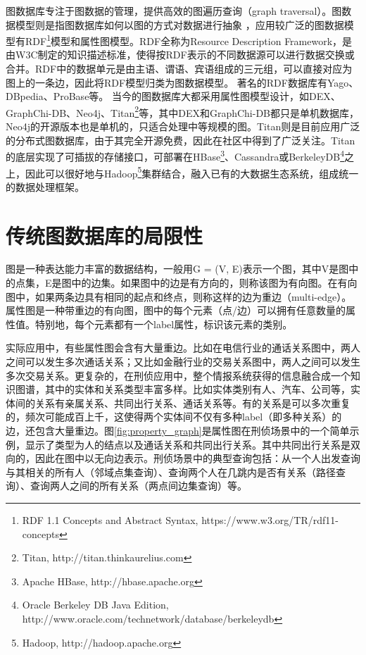 图数据库专注于图数据的管理，提供高效的图遍历查询（graph traversal）。图数据模型则是指图数据库如何以图的方式对数据进行抽象 \supercite{graph_models_survey}，应用较广泛的图数据模型有RDF\footnote{RDF 1.1 Concepts and Abstract Syntax, https://www.w3.org/TR/rdf11-concepts }模型和属性图模型。RDF全称为Resource Description Framework，是由W3C制定的知识描述标准，使得按RDF表示的不同数据源可以进行数据交换或合并。RDF中的数据单元是由主语、谓语、宾语组成的三元组，可以直接对应为图上的一条边，因此将RDF模型归类为图数据模型。
著名的RDF数据库有Yago\supercite{yago}、DBpedia\supercite{dbpedia}、ProBase\supercite{probase}等。
当今的图数据库大都采用属性图模型设计\supercite{graph_database_models}，如DEX\supercite{DEX}、GraphChi-DB\supercite{graphchi-db}、Neo4j\supercite{neo4j}、Titan\footnote{Titan, http://titan.thinkaurelius.com}等，其中DEX和GraphChi-DB都只是单机数据库，Neo4j的开源版本也是单机的，只适合处理中等规模的图。Titan则是目前应用广泛的分布式图数据库，由于其完全开源免费，因此在社区中得到了广泛关注。Titan的底层实现了可插拔的存储接口，可部署在HBase\footnote{Apache HBase, http://hbase.apache.org }、Cassandra\supercite{cassandra}或BerkeleyDB\footnote{Oracle Berkeley DB Java Edition, http://www.oracle.com/technetwork/database/berkeleydb }之上，因此可以很好地与Hadoop\footnote{Hadoop, http://hadoop.apache.org }集群结合，融入已有的大数据生态系统，组成统一的数据处理框架。

\section{传统图数据库的局限性}
图是一种表达能力丰富的数据结构，一般用G = (V, E)表示一个图，其中V是图中的点集，E是图中的边集。如果图中的边是有方向的，则称该图为有向图。在有向图中，如果两条边具有相同的起点和终点，则称这样的边为重边（multi-edge）。属性图\supercite{property_graph}是一种带重边的有向图，图中的每个元素（点/边）可以拥有任意数量的属性值。特别地，每个元素都有一个label属性，标识该元素的类别。

实际应用中，有些属性图会含有大量重边。比如在电信行业的通话关系图中，两人之间可以发生多次通话关系；又比如金融行业的交易关系图中，两人之间可以发生多次交易关系。更复杂的，在刑侦应用中，整个情报系统获得的信息融合成一个知识图谱\supercite{knowledge_graph}，其中的实体和关系类型丰富多样。比如实体类别有人、汽车、公司等，实体间的关系有亲属关系、共同出行关系、通话关系等。有的关系是可以多次重复的，频次可能成百上千，这使得两个实体间不仅有多种label（即多种关系）的边，还包含大量重边。图\ref{fig:property_graph}是属性图在刑侦场景中的一个简单示例，显示了类型为人的结点以及通话关系和共同出行关系。其中共同出行关系是双向的，因此在图中以无向边表示。刑侦场景中的典型查询包括：从一个人出发查询与其相关的所有人（邻域点集查询）、查询两个人在几跳内是否有关系（路径查询）、查询两人之间的所有关系（两点间边集查询）等。

